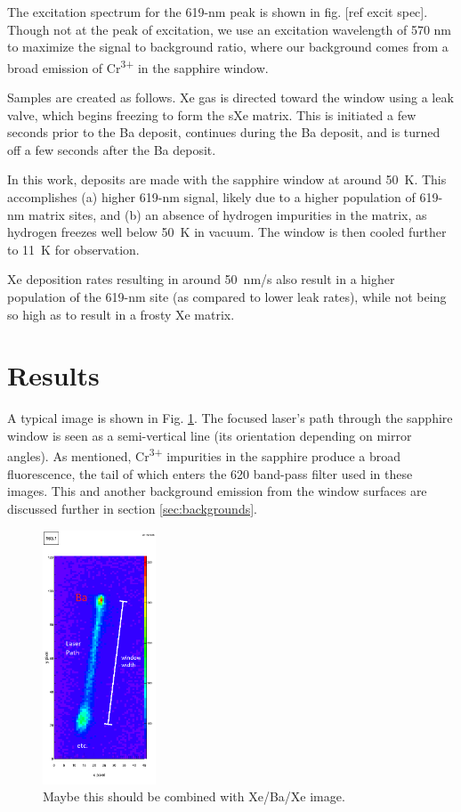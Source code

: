 \documentclass[aps,pra,reprint,superscriptaddress]{revtex4-1}
\begin{document}
The excitation spectrum for the 619-nm peak is shown in fig. [ref excit spec].  Though not at the peak of excitation, we use an excitation wavelength of 570 nm to maximize the signal to background ratio, where our background comes from a broad emission of Cr\textsuperscript{3+} in the sapphire window.

Samples are created as follows.  Xe gas is directed toward the window using a leak valve, which begins freezing to form the sXe matrix.  This is initiated a few seconds prior to the Ba deposit, continues during the Ba deposit, and is turned off a few seconds after the Ba deposit.  

In this work, deposits are made with the sapphire window at around 50~K. This accomplishes (a) higher 619-nm signal, likely due to a higher population of 619-nm matrix sites, and (b) an absence of hydrogen impurities in the matrix, as hydrogen freezes well below 50~K in vacuum.  The window is then cooled further to 11~K for observation.  

Xe deposition rates resulting in around {\color{blue}50~nm/s} also result in a higher population of the 619-nm site (as compared to lower leak rates), while not being so high as to result in a frosty Xe matrix.

\section{Results}
\label{sec:results}

A typical image is shown in Fig. \ref{fig:image_example}.  The focused laser's path through the sapphire window is seen as a semi-vertical line (its orientation depending on mirror angles).  As mentioned, Cr\textsuperscript{3+} impurities in the sapphire produce a broad fluorescence, the tail of which enters the 620 band-pass filter used in these images.  This and another background emission from the window surfaces are discussed further in section \ref{sec:backgrounds}.

\begin{figure}
\includegraphics[width=0.3\textwidth]{figures/2015-05-26_163_1.png}
\caption{{\color{red}Maybe this should be combined with Xe/Ba/Xe image.}}
\label{fig:image_example}
\end{figure}
\end{document}
